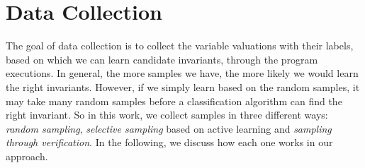 
\section{Data Collection} %
\label{sec:sampling}
The goal of data collection is  to collect the variable valuations with their labels, based on which we can learn candidate invariants, through the program executions. 
In general, the more samples we have, the more likely we would learn the right invariants. 
However, if we simply learn based on the random samples, it may take many random samples before a classification algorithm can find the right invariant. 
So in this work, we collect samples in three different ways: \emph{random sampling}, \emph{selective sampling} based on active learning and \emph{sampling through verification}. 
In the following, we discuss how each one works in our approach.



